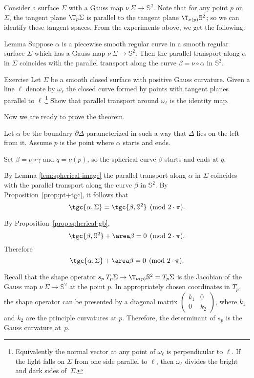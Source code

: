 Consider a surface $\Sigma$ with a Gauss map $\nu\:\Sigma\to \mathbb{S}^2$.
Note that for any point $p$ on $\Sigma$, the tangent plane $\T_p\Sigma$ is parallel to the tangent plane $\T_{\nu(p)}\mathbb{S}^2$; so we can identify these tangent spaces.
From the experiments above, we get the following:

\begin{thm}{Lemma}\label{lem:spherical-image}
Suppose $\alpha$ is a piecewise smooth regular curve in a smooth regular surface $\Sigma$ which has a Gauss map $\nu\:\Sigma\to \mathbb{S}^2$.
Then the parallel transport along $\alpha$ in $\Sigma$ coincides with the parallel transport along the curve $\beta=\nu\circ\alpha$ in $\mathbb{S}^2$.
\end{thm}

\begin{thm}{Exercise}
Let $\Sigma$ be a smooth closed surface with positive Gauss curvature.
Given a line $\ell$ denote by $\omega_\ell$ the closed curve formed by points with tangent planes parallel to $\ell$.\footnote{Equivalently the normal vector at any point of $\omega_\ell$ is perpendicular to $\ell$. If the light falls on $\Sigma$ from one side parallel to $\ell$, then $\omega_\ell$ divides the bright and dark sides of~$\Sigma$.}
Show that parallel transport around $\omega_\ell$ is the identity map.
\end{thm}

Now we are ready to prove the theorem.

Let $\alpha$ be the boundary $\partial\Delta$ parameterized in such a way that $\Delta$ lies on the left from it.
Assume $p$ is the point where $\alpha$ starts and ends.

Set $\beta=\nu\circ\gamma$ and $q=\nu(p)$, so the spherical curve $\beta$ starts and ends at $q$.

By Lemma \ref{lem:spherical-image} the parallel transport along $\alpha$ in $\Sigma$ coincides with the parallel transport along the curve $\beta$ in $\mathbb{S}^2$.
By Proposition~\ref{prop:pt+tgc}, it follows that 
\[\tgc{\alpha,\Sigma}=\tgc{\beta,\mathbb{S}^2} \pmod{2\cdot \pi}.\]

By Proposition~\ref{prop:spherical-gb},
\[\tgc{\beta,\mathbb{S}^2}+\area\beta=0\pmod{2\cdot \pi}.\]
Therefore 
\[\tgc{\alpha,\Sigma}+\area\beta=0\pmod{2\cdot \pi}.\]

Recall that the shape  operator $s_p\: T_p\Sigma \to \T_{\nu(p)}\mathbb{S}^2=T_p\Sigma$ is the Jacobian of the Gauss map $\nu\:\Sigma\to \mathbb{S}^2$ at the point $p$.
In appropriately chosen coordinates in $T_p$, the shape operator can be presented by a diagonal matrix 
$\left(\begin{smallmatrix}
k_1&0
\\
0&k_2
\end{smallmatrix}\right)$, where $k_1$ and $k_2$ are the principle curvatures at $p$.
Therefore, the determinant of $s_p$ is the Gauss curvature at~$p$.

